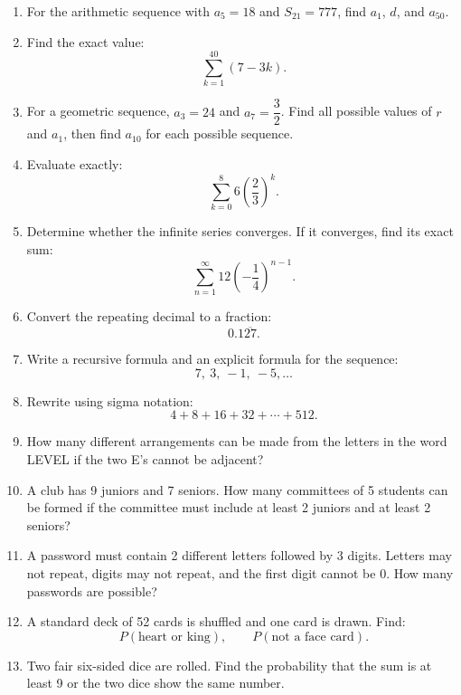 \documentclass[12pt]{article}
\begin{document}
\begin{enumerate}[leftmargin=*, itemsep=1em, topsep=0.8em]
  \item For the arithmetic sequence with $a_5=18$ and $S_{21}=777$, find $a_1$, $d$, and $a_{50}$.

  \item Find the exact value:
  \[
  \sum_{k=1}^{40}(7-3k).
  \]

  \item For a geometric sequence, $a_3=24$ and $a_7=\dfrac{3}{2}$. Find all possible values of $r$ and $a_1$, then find $a_{10}$ for each possible sequence.

  \item Evaluate exactly:
  \[
  \sum_{k=0}^{8}6\left(\frac{2}{3}\right)^k.
  \]

  \item Determine whether the infinite series converges. If it converges, find its exact sum:
  \[
  \sum_{n=1}^{\infty}12\left(-\frac14\right)^{n-1}.
  \]

  \item Convert the repeating decimal to a fraction:
  \[
  0.1\overline{27}.
  \]

  \item Write a recursive formula and an explicit formula for the sequence:
  \[
  7,\ 3,\ -1,\ -5,\ldots
  \]

  \item Rewrite using sigma notation:
  \[
  4+8+16+32+\cdots+512.
  \]

  \item How many different arrangements can be made from the letters in the word \textsc{LEVEL} if the two E's cannot be adjacent?

  \item A club has 9 juniors and 7 seniors. How many committees of 5 students can be formed if the committee must include at least 2 juniors and at least 2 seniors?

  \item A password must contain 2 different letters followed by 3 digits. Letters may not repeat, digits may not repeat, and the first digit cannot be 0. How many passwords are possible?

  \item A standard deck of 52 cards is shuffled and one card is drawn. Find:
  \[
  P(\text{heart or king}),\qquad
  P(\text{not a face card}).
  \]

  \item Two fair six-sided dice are rolled. Find the probability that the sum is at least 9 or the two dice show the same number.


\end{enumerate}
\end{document}
